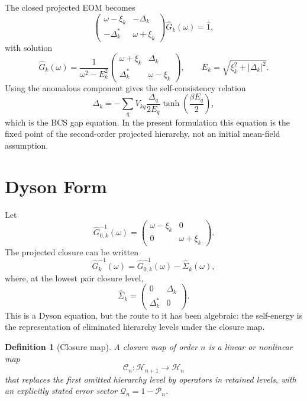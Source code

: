 \documentclass[aps,prb,reprint,superscriptaddress,nofootinbib]{revtex4-2}
\newtheorem{definition}{Definition}
\newcommand{\Hh}{\mathcal{H}}
\newcommand{\Pc}{\mathcal{P}}
\newcommand{\Qc}{\mathcal{Q}}
\newcommand{\Cc}{\mathcal{C}}
\begin{document}
The closed projected EOM becomes
\begin{equation}
\begin{pmatrix}
\omega-\xi_k & -\Delta_k\\
-\Delta_k^\ast & \omega+\xi_k
\end{pmatrix}
\hat{G}_k(\omega)=\hat{1},
\end{equation}
with solution
\begin{equation}
\hat{G}_k(\omega)
=
\frac{1}{\omega^2-E_k^2}
\begin{pmatrix}
\omega+\xi_k & \Delta_k\\
\Delta_k^\ast & \omega-\xi_k
\end{pmatrix},
\qquad
E_k=\sqrt{\xi_k^2+|\Delta_k|^2}.
\end{equation}
Using the anomalous component gives the self-consistency relation
\begin{equation}
\Delta_k
=-\sum_q V_{kq}
\frac{\Delta_q}{2E_q}\tanh\left(\frac{\beta E_q}{2}\right),
\end{equation}
which is the BCS gap equation. In the present formulation this equation is the fixed point of the second-order projected hierarchy, not an initial mean-field assumption.

\section{Dyson Form}

Let
\begin{equation}
\hat{G}_{0,k}^{-1}(\omega)=
\begin{pmatrix}
\omega-\xi_k&0\\
0&\omega+\xi_k
\end{pmatrix}.
\end{equation}
The projected closure can be written
\begin{equation}
\hat{G}_k^{-1}(\omega)
=\hat{G}_{0,k}^{-1}(\omega)-\hat{\Sigma}_k(\omega),
\end{equation}
where, at the lowest pair closure level,
\begin{equation}
\hat{\Sigma}_k=
\begin{pmatrix}
0&\Delta_k\\
\Delta_k^\ast&0
\end{pmatrix}.
\end{equation}
This is a Dyson equation, but the route to it has been algebraic: the self-energy is the representation of eliminated hierarchy levels under the closure map.

\begin{definition}[Closure map]
A closure map of order \(n\) is a linear or nonlinear map
\begin{equation}
\Cc_n:\Hh_{n+1}\to \Hh_n
\end{equation}
that replaces the first omitted hierarchy level by operators in retained levels, with an explicitly stated error sector \(\Qc_n=1-\Pc_n\).
\end{definition}
\end{document}
